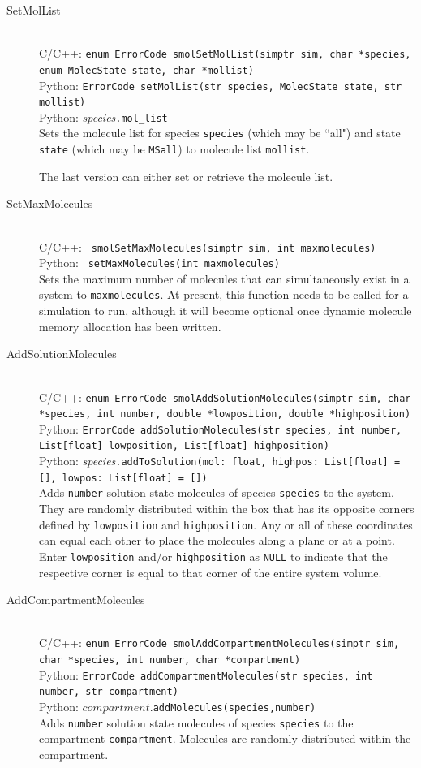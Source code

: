 \documentclass {scrbook}
\newcommand {\ttt} {\texttt}
\begin{document}
\begin{description}
\item[SetMolList]
\hfill \\
C/C++: \ttt{enum ErrorCode smolSetMolList(simptr sim, char *species, enum MolecState state, char *mollist)}\\
Python: \ttt{ErrorCode setMolList(str species, MolecState state, str mollist)}\\
Python: \textit{species}\ttt{.mol\_list}\\
Sets the molecule list for species \ttt{species} (which may be ``all") and state \ttt{state} (which may be \ttt{MSall}) to molecule list \ttt{mollist}.

The last version can either set or retrieve the molecule list.

\item[SetMaxMolecules]
\hfill \\
C/C++: \ttt{ smolSetMaxMolecules(simptr sim, int maxmolecules)}\\
Python: \ttt{ setMaxMolecules(int maxmolecules)}\\
Sets the maximum number of molecules that can simultaneously exist in a system to \ttt{maxmolecules}. At present, this function needs to be called for a simulation to run, although it will become optional once dynamic molecule memory allocation has been written.

\item[AddSolutionMolecules]
\hfill \\
C/C++: \ttt{enum ErrorCode smolAddSolutionMolecules(simptr sim, char *species, int number, double *lowposition, double *highposition)}\\
Python: \ttt{ErrorCode addSolutionMolecules(str species, int number, List[float] lowposition, List[float] highposition)}\\
Python: \textit{species}\ttt{.addToSolution(mol: float, highpos: List[float] = [], lowpos: List[float] = [])}\\
Adds \ttt{number} solution state molecules of species \ttt{species} to the system. They are randomly distributed within the box that has its opposite corners defined by \ttt{lowposition} and \ttt{highposition}. Any or all of these coordinates can equal each other to place the molecules along a plane or at a point. Enter \ttt{lowposition} and/or \ttt{highposition} as \ttt{NULL} to indicate that the respective corner is equal to that corner of the entire system volume.

\item[AddCompartmentMolecules]
\hfill \\
C/C++: \ttt{enum ErrorCode smolAddCompartmentMolecules(simptr sim, char *species, int number, char *compartment)}\\
Python: \ttt{ErrorCode addCompartmentMolecules(str species, int number, str compartment)}\\
Python: $compartment$.\ttt{addMolecules(species,number)}\\
Adds \ttt{number} solution state molecules of species \ttt{species} to the compartment \ttt{compartment}. Molecules are randomly distributed within the compartment.


\end{description}
\end{document}
